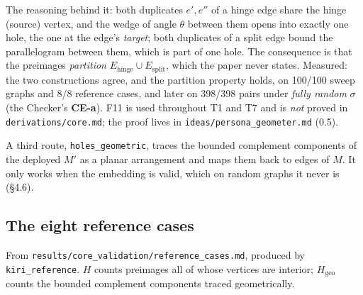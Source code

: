 \documentclass[10pt,a4paper]{article}
\newcommand{\fn}[1]{\nolinkurl{#1}}
\begin{document}
The reasoning behind it: both duplicates $e', e''$ of a hinge edge share the hinge (source)
vertex, and the wedge of angle $\theta$ between them opens into exactly one hole, the one at the
edge's \emph{target}; both duplicates of a split edge bound the parallelogram between them,
which is part of one hole. The consequence is that the preimages \emph{partition}
$E_{\mathrm{hinge}}\cup E_{\mathrm{split}}$, which the paper never states.
Measured: the two constructions agree, and the partition property holds, on 100/100 sweep
graphs and 8/8 reference cases, and later on 398/398 pairs under \emph{fully random} $\sigma$
(the Checker's \textbf{CE-a}). F11 is used throughout T1 and T7 and is \emph{not} proved in
\fn{derivations/core.md}; the proof lives in \fn{ideas/persona_geometer.md} (0.5).

A third route, \fn{holes_geometric}, traces the bounded complement components of the deployed
$M'$ as a planar arrangement and maps them back to edges of $M$. It only works when the
embedding is valid, which on random graphs it never is (\S4.6).

\subsection{The eight reference cases}

From \fn{results/core_validation/reference_cases.md}, produced by \fn{kiri_reference}.
$H$ counts preimages all of whose vertices are interior; $H_{\mathrm{geo}}$ counts the bounded
complement components traced geometrically.
\end{document}
